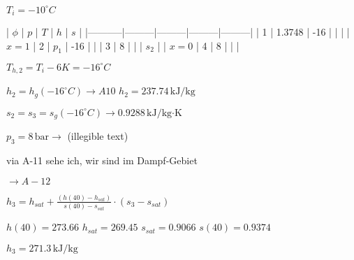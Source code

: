 \( T_i = -10^\circ C \)  

| \( \phi \) | \( p \) | \( T \) | \( h \) | \( s \) |  
|-----------|---------|---------|---------|---------|  
| 1         | 1.3748 | -16     |         |         |  
| \( x = 1 \) | 2     | \( p_1 \) | -16     |         |  
| 3         | 8       |         |         | \( s_2 \) |  
| \( x = 0 \) | 4     | 8       |         |         |  

\( T_{h,2} = T_i - 6K = -16^\circ C \)  

\( h_2 = h_g(-16^\circ C) \rightarrow A10 \)  
\( h_2 = 237.74 \, \text{kJ/kg} \)  

\( s_2 = s_3 = s_g(-16^\circ C) \rightarrow 0.9288 \, \text{kJ/kg·K} \)  

\( p_3 = 8 \, \text{bar} \rightarrow \) (illegible text)  

via A-11 sehe ich, wir sind im Dampf-Gebiet  

\( \rightarrow A-12 \)  

\( h_3 = h_{sat} + \frac{(h(40) - h_{sat})}{s(40) - s_{sat}} \cdot (s_3 - s_{sat}) \)  

\( h(40) = 273.66 \)  
\( h_{sat} = 269.45 \)  
\( s_{sat} = 0.9066 \)  
\( s(40) = 0.9374 \)  

\( h_3 = 271.3 \, \text{kJ/kg} \)